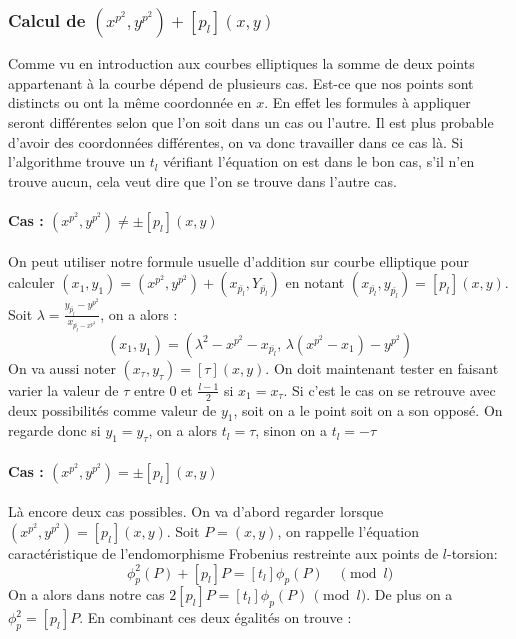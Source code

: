 \documentclass[12pt]{article}
\begin{document}
\subsubsection{Calcul de $(x^{p^2}, y^{p^2}) + [p_l](x,y)$}

Comme vu en introduction aux courbes elliptiques la somme de deux points appartenant à la courbe dépend de plusieurs cas. Est-ce que nos points sont distincts ou ont la même coordonnée en $x$. En effet les formules à appliquer seront différentes selon que l'on soit dans un cas ou l'autre. Il est plus probable d'avoir des coordonnées différentes, on va donc travailler dans ce cas là. Si l'algorithme trouve un $t_l$ vérifiant l'équation on est dans le bon cas, s'il n'en trouve aucun, cela veut dire que l'on se trouve dans l'autre cas.
\paragraph*{Cas : $(x^{p^2}, y^{p^2}) \ne \pm [p_l](x,y)$}

On peut utiliser notre formule usuelle d'addition sur courbe elliptique pour calculer $(x_1, y_1) = (x^{p^2}, y^{p^2}) + (x_{\bar{p_l}}, Y_{\bar{p_l}})$ en notant $(x_{\bar{p_l}}, y_{\bar{p_l}}) =  [p_l](x,y)$. 
\newline
Soit $\lambda = \frac{y_{\bar{p_l}} - y^{p^2}}{x_{\bar{p_l} - x^{p^2}}}$, on a alors :
\begin{equation}
(x_1, y_1) = (\lambda^2 - x^{p^2} - x_{\bar{p_l}}, \, \lambda (x^{p^2} - x_1) -  y^{p^2})
\end{equation}
On va aussi noter $(x_{\tau}, y_{\tau}) =  [\tau](x,y)$. On doit maintenant tester en faisant varier la valeur de $\tau$ entre $0$ et $\frac{l-1}{2}$ si $x_1 = x_{\tau}$. Si c'est le cas on se retrouve avec deux possibilités comme valeur de $y_1$, soit on a le point soit on a son opposé. On regarde donc si $y_1 = y_{\tau}$, on a alors $t_l = \tau$, sinon on a $t_l = - \tau$

\paragraph*{Cas : $(x^{p^2}, y^{p^2}) = \pm [p_l](x,y)$}
Là encore deux cas possibles. On va d'abord regarder lorsque $(x^{p^2}, y^{p^2}) = [p_l](x,y)$. 
\newline
Soit $P=(x,y)$, on rappelle l’équation caractéristique de l'endomorphisme Frobenius restreinte aux points de $l$-torsion: 
\begin{equation}
\phi_p^2(P)  + [p_l]P = [t_{l}] \phi_p(P) \quad \pmod{l}
\end{equation}
On a alors dans notre cas $2[p_l]P = [t_{l}] \phi_p(P) \, \pmod{l}$. De plus on a $\phi_p^2 = [p_l]P$. En combinant ces deux égalités on trouve :
\end{document}
